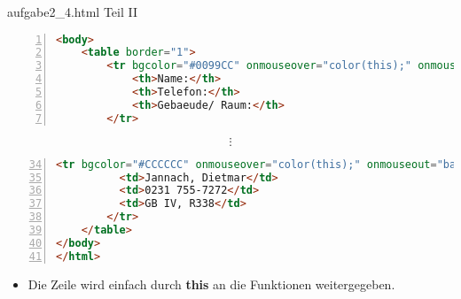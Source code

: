 \begin{frame}[fragile]{aufgabe2\_4.html Teil II}
\tiny{\begin{lstlisting}[language = HTML,
  		   keywordstyle=\color{blue}\bfseries,
  stringstyle=\color{red}\ttfamily,
                   breaklines=true, 
		   firstnumber=last,
                   numbers = left, 
                   numbersep = 3pt]
<body>
	<table border="1">
    	<tr bgcolor="#0099CC" onmouseover="color(this);" onmouseout="backcolor(this)">
        	<th>Name:</th>
        	<th>Telefon:</th>
        	<th>Gebaeude/ Raum:</th>
        </tr>
\end{lstlisting}
\[\vdots\]
\begin{lstlisting}[language = HTML,
  		   keywordstyle=\color{blue}\bfseries,
  stringstyle=\color{red}\ttfamily,
                   breaklines=true, 
		   firstnumber=34,
                   numbers = left, 
                   numbersep = 3pt]
        <tr bgcolor="#CCCCCC" onmouseover="color(this);" onmouseout="backcolor(this)">
          <td>Jannach, Dietmar</td>
          <td>0231 755-7272</td>
          <td>GB IV, R338</td>
        </tr>
    </table>
</body>
</html>
\end{lstlisting}}
\normalsize
\pause
\begin{itemize}
\item Die Zeile wird einfach durch \textbf{this} an die Funktionen weitergegeben.
\end{itemize}
\end{frame}
